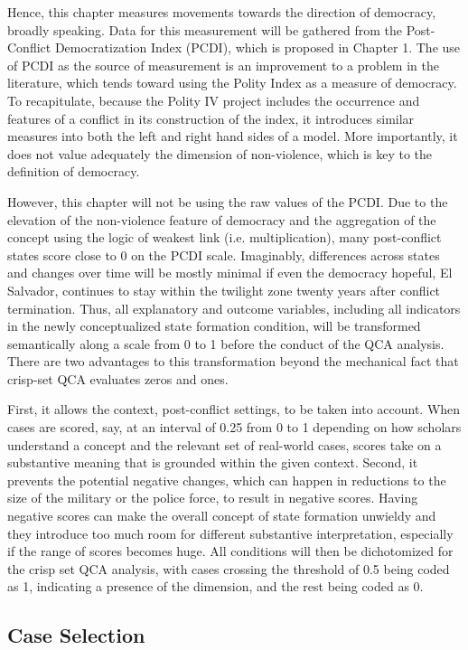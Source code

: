 \documentclass [11pt]{article}
\begin{document}
Hence, this chapter measures movements towards the direction of democracy, broadly speaking. Data for this measurement will be gathered from the Post-Conflict Democratization Index (PCDI), which is proposed in Chapter 1. The use of PCDI as the source of measurement is an improvement to a problem in the literature, which tends toward using the Polity Index as a measure of democracy. To recapitulate, because the Polity IV project includes the occurrence and features of a conflict in its construction of the index, it introduces similar measures into both the left and right hand sides of a model. More importantly, it does not value adequately the dimension of non-violence, which is key to the definition of democracy.

However, this chapter will not be using the raw values of the PCDI. Due to the elevation of the non-violence feature of democracy and the aggregation of the concept using the logic of weakest link (i.e. multiplication), many post-conflict states score close to 0 on the PCDI scale. Imaginably, differences across states and changes over time will be mostly minimal if even the democracy hopeful, El Salvador, continues to stay within the twilight zone twenty years after conflict termination. Thus, all explanatory and outcome variables, including all indicators in the newly conceptualized state formation condition, will be transformed semantically along a scale from 0 to 1 before the conduct of the QCA analysis. There are two advantages to this transformation beyond the mechanical fact that crisp-set QCA evaluates zeros and ones.

First, it allows the context, post-conflict settings, to be taken into account. When cases are scored, say, at an interval of 0.25 from 0 to 1 depending on how scholars understand a concept and the relevant set of real-world cases, scores take on a substantive meaning that is grounded within the given context. Second, it prevents the potential negative changes, which can happen in reductions to the size of the military or the police force, to result in negative scores. Having negative scores can make the overall concept of state formation unwieldy and they introduce too much room for different substantive interpretation, especially if the range of scores becomes huge. All conditions will then be dichotomized for the crisp set QCA analysis, with cases crossing the threshold of 0.5 being coded as 1, indicating a presence of the dimension, and the rest being coded as 0.

\subsection*{Case Selection}
\end{document}
